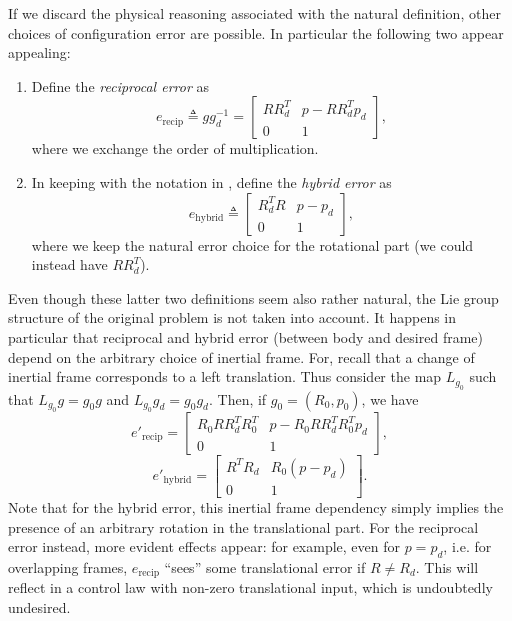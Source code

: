 \documentclass[11pt]{article}
\begin{document}
If we discard the physical reasoning associated with the natural definition, other choices of configuration error are possible. In particular the following two appear appealing:
\begin{enumerate}
\item Define the \emph{reciprocal error} as
\begin{equation*}
e_{\mathrm{recip}}\triangleq gg_d^{-1}=\begin{bmatrix}RR_d^T&p-RR_d^Tp_d\\0&1\end{bmatrix},\tag{5.3}\label{eq:5.3}
\end{equation*}
where we exchange the order of multiplication.
\item In keeping with the notation in \cite{26}, define the \emph{hybrid error} as
\begin{equation*}
e_{\mathrm{hybrid}}\triangleq\begin{bmatrix}R_d^TR&p-p_d\\0&1\end{bmatrix},\tag{5.4}\label{eq:5.4}
\end{equation*}
where we keep the natural error choice for the rotational part (we could instead have $RR_d^T$).
\end{enumerate}

Even though these latter two definitions seem also rather natural, the Lie group structure of the original problem is not taken into account. It happens in particular that reciprocal and hybrid error (between body and desired frame) depend on the arbitrary choice of inertial frame. For, recall that a change of inertial frame corresponds to a left translation. Thus consider the map $L_{g_0}$ such that $L_{g_0}g=g_0g$ and $L_{g_0}g_d=g_0g_d$. Then, if $g_0=(R_0,p_0)$, we have
\begin{equation*}
e'_{\mathrm{recip}}=\begin{bmatrix}R_0RR_d^TR_0^T&p-R_0RR_d^TR_0^Tp_d\\0&1\end{bmatrix},
\end{equation*}
\begin{equation*}
e'_{\mathrm{hybrid}}=\begin{bmatrix}R^TR_d&R_0(p-p_d)\\0&1\end{bmatrix}.
\end{equation*}
Note that for the hybrid error, this inertial frame dependency simply implies the presence of an arbitrary rotation in the translational part. For the reciprocal error instead, more evident effects appear: for example, even for $p=p_d$, i.e. for overlapping frames, $e_{\mathrm{recip}}$ ``sees'' some translational error if $R\neq R_d$. This will reflect in a control law with non-zero translational input, which is undoubtedly undesired.
\end{document}
